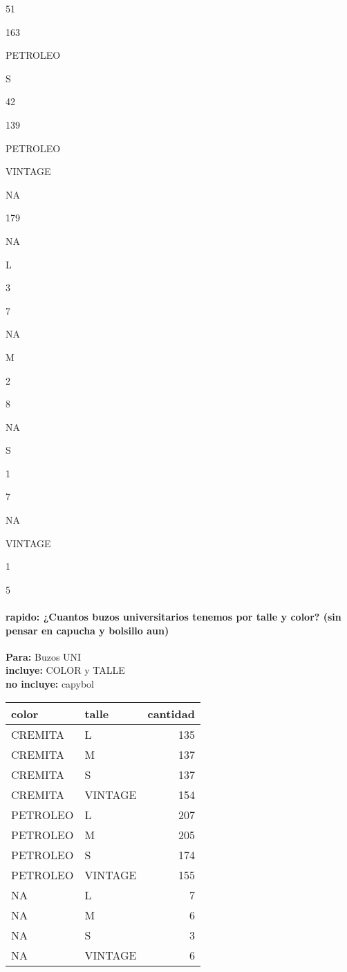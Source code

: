 \documentclass[
]{article}
\begin{document}
51

163

PETROLEO

S

42

139

PETROLEO

VINTAGE

NA

179

NA

L

3

7

NA

M

2

8

NA

S

1

7

NA

VINTAGE

1

5

\hypertarget{rapido-cuantos-buzos-universitarios-tenemos-por-talle-y-color-sin-pensar-en-capucha-y-bolsillo-aun}{%
\paragraph{rapido: ¿Cuantos buzos universitarios tenemos por talle y
color? (sin pensar en capucha y bolsillo
aun)}\label{rapido-cuantos-buzos-universitarios-tenemos-por-talle-y-color-sin-pensar-en-capucha-y-bolsillo-aun}}

\textbf{Para:} Buzos UNI\\
\textbf{incluye:} COLOR y TALLE\\
\textbf{no incluye:} capybol

\begin{longtable}[t]{llr}
\toprule
color & talle & cantidad\\
\midrule
CREMITA & L & 135\\
CREMITA & M & 137\\
CREMITA & S & 137\\
CREMITA & VINTAGE & 154\\
PETROLEO & L & 207\\
\addlinespace
PETROLEO & M & 205\\
PETROLEO & S & 174\\
PETROLEO & VINTAGE & 155\\
NA & L & 7\\
NA & M & 6\\
\addlinespace
NA & S & 3\\
NA & VINTAGE & 6\\
\bottomrule
\end{longtable}
\end{document}
